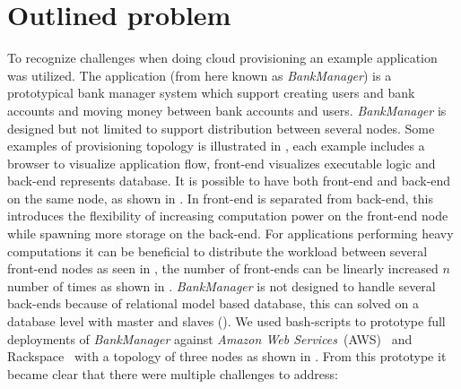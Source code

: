 


\section{Outlined problem}

To recognize challenges when doing cloud provisioning an example application~\cite{BankManager} was utilized.
The application (from here known as \emph{BankManager}) is a prototypical bank manager system
which support creating users and bank accounts and moving money between bank accounts and users.
\emph{BankManager} is designed but not limited to support distribution between several nodes.
Some examples of provisioning topology is illustrated in , each
example includes a browser to visualize application flow, front-end visualizes executable
logic and back-end represents database.
It is possible to have both front-end and back-end on the same node, as shown in .
In  front-end is separated from back-end, 
this introduces the flexibility of increasing computation power on the front-end node while spawning more
storage on the back-end. 
For applications performing heavy computations it can be beneficial to distribute the workload between several
front-end nodes as seen in , the number of front-ends can be linearly increased 
$n$ number of times as shown in .
\emph{BankManager} is not designed to handle several back-ends because of relational model based database,
this can solved on a database level with master and slaves ().
We used bash-scripts to prototype full deployments of \emph{BankManager} against \emph{Amazon Web Services}~(AWS)~\cite{aws}
and Rackspace~\cite{rackspace} with a topology of three nodes as shown in .
From this prototype it became clear that there were multiple challenges to address:

